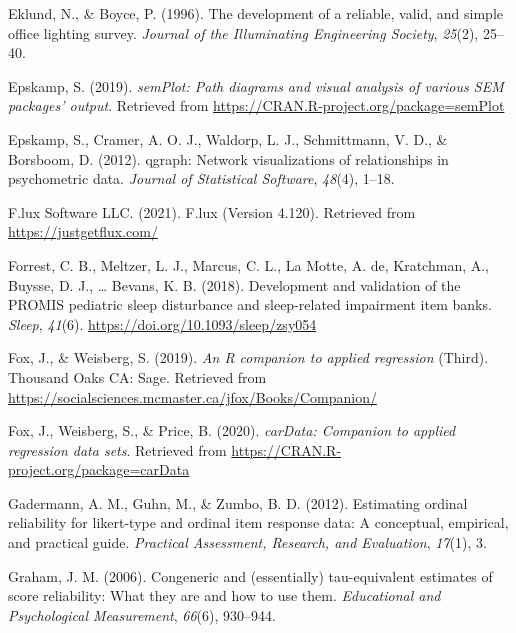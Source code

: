 \documentclass[
  english,
  man]{apa6}
\newlength{\cslhangindent}
\newlength{\cslentryspacingunit} %
\newenvironment{CSLReferences}[2] %
 {%
  \setlength{\parindent}{0pt}
  \ifodd #1
  \let\oldpar\par
  \def\par{\hangindent=\cslhangindent\oldpar}
  \fi
  \setlength{\parskip}{#2\cslentryspacingunit}
 }%
 {}
\begin{document}
\begin{CSLReferences}{1}{0}
\leavevmode{}%
Eklund, N., \& Boyce, P. (1996). The development of a reliable, valid, and simple office lighting survey. \emph{Journal of the Illuminating Engineering Society}, \emph{25}(2), 25--40.

\leavevmode{}%
Epskamp, S. (2019). \emph{semPlot: Path diagrams and visual analysis of various SEM packages' output}. Retrieved from \url{https://CRAN.R-project.org/package=semPlot}

\leavevmode{}%
Epskamp, S., Cramer, A. O. J., Waldorp, L. J., Schmittmann, V. D., \& Borsboom, D. (2012). {qgraph}: Network visualizations of relationships in psychometric data. \emph{Journal of Statistical Software}, \emph{48}(4), 1--18.

\leavevmode{}%
F.lux Software LLC. (2021). F.lux (Version 4.120). Retrieved from \url{https://justgetflux.com/}

\leavevmode{}%
Forrest, C. B., Meltzer, L. J., Marcus, C. L., La Motte, A. de, Kratchman, A., Buysse, D. J., \ldots{} Bevans, K. B. (2018). Development and validation of the PROMIS pediatric sleep disturbance and sleep-related impairment item banks. \emph{Sleep}, \emph{41}(6). \url{https://doi.org/10.1093/sleep/zsy054}

\leavevmode{}%
Fox, J., \& Weisberg, S. (2019). \emph{An {R} companion to applied regression} (Third). Thousand Oaks {CA}: Sage. Retrieved from \url{https://socialsciences.mcmaster.ca/jfox/Books/Companion/}

\leavevmode{}%
Fox, J., Weisberg, S., \& Price, B. (2020). \emph{carData: Companion to applied regression data sets}. Retrieved from \url{https://CRAN.R-project.org/package=carData}

\leavevmode{}%
Gadermann, A. M., Guhn, M., \& Zumbo, B. D. (2012). Estimating ordinal reliability for likert-type and ordinal item response data: A conceptual, empirical, and practical guide. \emph{Practical Assessment, Research, and Evaluation}, \emph{17}(1), 3.

\leavevmode{}%
Graham, J. M. (2006). Congeneric and (essentially) tau-equivalent estimates of score reliability: What they are and how to use them. \emph{Educational and Psychological Measurement}, \emph{66}(6), 930--944.


\end{CSLReferences}
\end{document}
